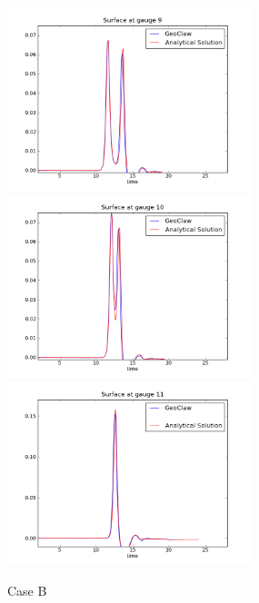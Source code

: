\begin{figure}[ht]
\hfil\includegraphics[width=2.8in]{bp2/CaseB/gauge0009fig300.png}\hfil
\vskip 5pt
\hfil\includegraphics[width=2.8in]{bp2/CaseB/gauge0010fig300.png}\hfil
\hfil\includegraphics[width=2.8in]{bp2/CaseB/gauge0011fig300.png}\hfil
\caption{\label{fig:bp2B} Case B }
\end{figure}

